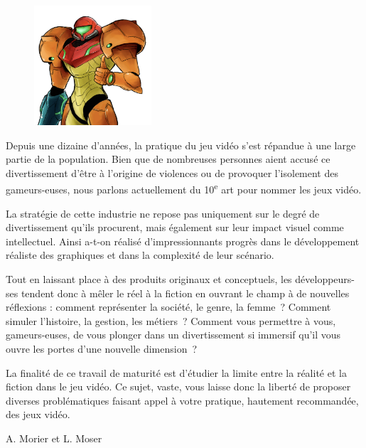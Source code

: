 \documentclass[
  10pt,
  french,
  a5paper,
  openany]{book}
\newenvironment{signature}{\begin{flushright}}{\end{flushright}}
\begin{document}
\begin{figure}

{\centering \includegraphics[height=12em]{images/le-jeu-video-fiction-ou-realite} 

}

\end{figure}


Depuis une dizaine d'années, la pratique du jeu vidéo s'est répandue à une large partie de la population. Bien que de nombreuses personnes aient accusé ce divertissement d'être à l'origine de violences ou de provoquer l'isolement des gameurs-euses, nous parlons actuellement du 10\textsuperscript{e} art pour nommer les jeux vidéo.

La stratégie de cette industrie ne repose pas uniquement sur le degré de divertissement qu'ils procurent, mais également sur leur impact visuel comme intellectuel. Ainsi a-t-on réalisé d'impressionnants progrès dans le développement réaliste des graphiques et dans la complexité de leur scénario.

Tout en laissant place à des produits originaux et conceptuels, les développeurs-ses tendent donc à mêler le réel à la fiction en ouvrant le champ à de nouvelles réflexions : comment représenter la société, le genre, la femme~? Comment simuler l'histoire, la gestion, les métiers~? Comment vous permettre à vous, gameurs-euses, de vous plonger dans un divertissement si immersif qu'il vous ouvre les portes d'une nouvelle dimension~?

\clearpage

La finalité de ce travail de maturité est d'étudier la limite entre la réalité et la fiction dans le jeu vidéo. Ce sujet, vaste, vous laisse donc la liberté de proposer diverses problématiques faisant appel à votre pratique, hautement recommandée, des jeux vidéo.

\begin{signature}
A. Morier et L. Moser

\end{signature}
\end{document}
